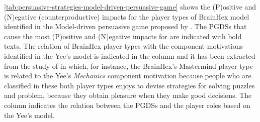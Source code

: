 \autoref{tab:persuasive-strategies-model-driven-persuasive-game} shows the (P)ositive and (N)egative  (counterproductive) impacts for the player types of BrainHex model identified in the Model-driven persuasive game proposed by . The PGDSs that cause the most (P)ositive and (N)egative impacts for  are indicated with bold texts. The relation of BrainHex player types with the component motivations identified in the Yee's model is indicated in the column  and it has been extracted from the study of  in which, for instance, the BrainHex's Mastermind player type is related to the Yee's \emph{Mechanics} component motivation because people who are classified in these both player types enjoys to devise strategies for solving puzzles and problem, because they obtain pleasure when they make good decisions. The column  indicates the relation between the PGDSs and the player roles based on the Yee's model.


